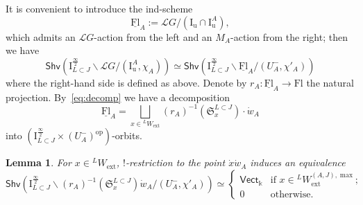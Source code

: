 \documentclass[11pt]{amsart}
\numberwithin{equation}{section}
\theoremstyle{plain}
\newtheorem{lem}[thm]{Lemma}
\theoremstyle{definition}
\newcommand{\I}{{\mathrm I}}
\renewcommand{\k}{\Bbbk}
\newcommand{\sL}{{\mathcal L}}
\newcommand{\rQ}{{\mathrm Q}}
\newcommand{\Vect}{\mathsf{Vect}}
\newcommand{\semi}{{{\frac{\infty}{2}}}}
\newcommand{\quar}{{{\frac{\infty}{4}}}}
\newcommand{\ex}{\mathrm{ext}}
\newcommand{\Shv}{\mathsf{Shv}}
\newcommand{\Fl}{\mathrm{Fl}}
\newcommand{\Gr}{\mathrm{Gr}}
\newcommand{\Iu}{\mathrm{I}_{\mathrm{u}}}
\newcommand{\rS}{\mathfrak{S}}
\newcommand{\uFl}{\underline{\Fl}}
\begin{document}
It is convenient to introduce the ind-scheme 
\[
\uFl_A := \sL G / (\Iu \cap \Iu^A),
\]
which admits an $\sL G$-action from the left and an $M_A$-action from the right; then we have
\[
\Shv \left( \I_{L \subset J}^{\semi}\backslash \sL G/(\Iu^A,\chi_A) \right) \simeq \Shv \left( \I_{L \subset J}^{\semi} \backslash \uFl_A /(U_A^-,\chi'_A) \right)
\]
where the right-hand side is defined as above.
Denote by $r_A: \uFl_A \rightarrow \Fl$ the natural projection. 
By~\eqref{eq:decomp} we have a decomposition
\begin{equation}
\label{eq:decomp-tGr}
\uFl_A= \bigsqcup_{x\in {}^L W_\ex} (r_A)^{-1}(\rS^{L \subset J}_{x}) \cdot \dot{w}_A
\end{equation}
into $(\I_{L \subset J}^\semi \times (U_A^-)^\mathrm{op})$-orbits.

\begin{lem}
\label{lem:whit}
For $x\in {}^L W_\ex$, $!$-restriction to the point $\dot{x}\dot{w}_A$ induces an equivalence 
\begin{equation*}
\Shv\left( \I_{L \subset J}^{\semi} \backslash (r_A)^{-1}(\rS^{L \subset J}_x)\dot{w}_A / (U_A^-,\chi'_A) \right)
\simeq
\begin{cases}
\Vect_\k & \text{if $x\in {}^L W_\ex^{(A,J),\max}$;} 
\\ 0 & \text{otherwise.} 
\end{cases}
\end{equation*}
\end{lem}
\end{document}
